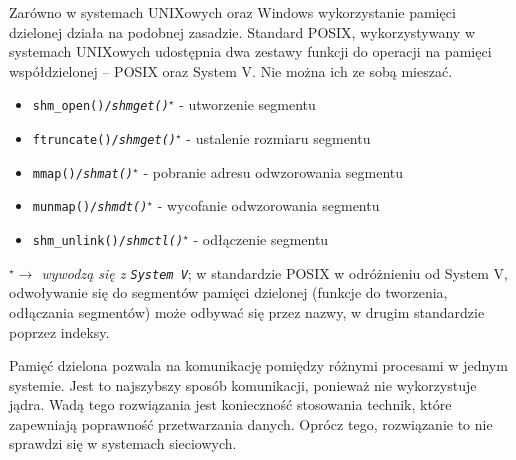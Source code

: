 Zarówno w systemach UNIXowych oraz Windows wykorzystanie pamięci dzielonej działa na podobnej zasadzie. Standard POSIX, wykorzystywany w systemach UNIXowych udostępnia dwa zestawy funkcji do operacji na pamięci współdzielonej -- POSIX oraz System V. Nie można ich ze sobą mieszać.
\begin{itemize}
\item \texttt{shm\_open()/\textit{shmget()$^\star$}} - utworzenie segmentu
\item \texttt{ftruncate()/\textit{shmget()$^\star$}} - ustalenie rozmiaru segmentu
\item \texttt{mmap()/\textit{shmat()$^\star$}} - pobranie adresu odwzorowania segmentu
\item \texttt{munmap()/\textit{shmdt()$^\star$}} - wycofanie odwzorowania segmentu
\item \texttt{shm\_unlink()/\textit{shmctl()$^\star$}} - odłączenie segmentu
\end{itemize}
\textit{$^\star \to$ wywodzą się z \texttt{System V}};
w standardzie POSIX w odróżnieniu od System V, odwoływanie się do segmentów pamięci dzielonej (funkcje do tworzenia, odłączania segmentów) może odbywać się przez nazwy, w drugim standardzie poprzez indeksy.

Pamięć dzielona pozwala na komunikację pomiędzy różnymi procesami w jednym systemie. Jest to najszybszy sposób komunikacji, ponieważ nie wykorzystuje jądra. Wadą tego rozwiązania jest konieczność stosowania technik, które zapewniają poprawność przetwarzania danych. Oprócz tego, rozwiązanie to nie sprawdzi się w systemach sieciowych.
